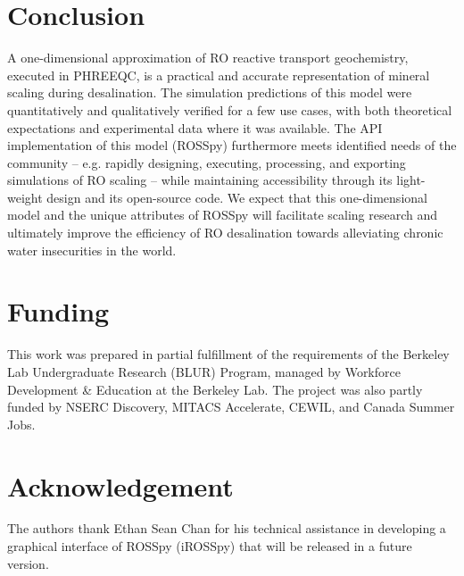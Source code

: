 \section{Conclusion}

A one-dimensional approximation of RO reactive transport geochemistry, executed in PHREEQC, is a practical and accurate representation of mineral scaling during desalination. The simulation predictions of this model were quantitatively and qualitatively verified for a few use cases, with both theoretical expectations and experimental data where it was available. The API implementation of this model (ROSSpy) furthermore meets identified needs of the community -- e.g. rapidly designing, executing, processing, and exporting simulations of RO scaling -- while maintaining accessibility through its light-weight design and its open-source code. We expect that this one-dimensional model and the unique attributes of ROSSpy  will facilitate scaling research and ultimately improve the efficiency of RO desalination towards alleviating chronic water insecurities in the world. 

\section{Funding}
This work was prepared in partial fulfillment of the requirements of the Berkeley Lab Undergraduate Research (BLUR) Program, managed by Workforce Development \& Education at the Berkeley Lab. The project was also partly funded by NSERC Discovery, MITACS Accelerate, CEWIL, and Canada Summer Jobs. 

\section{Acknowledgement}
The authors thank Ethan Sean Chan for his technical assistance in developing a graphical interface of ROSSpy (iROSSpy) that will be released in a future version. 
